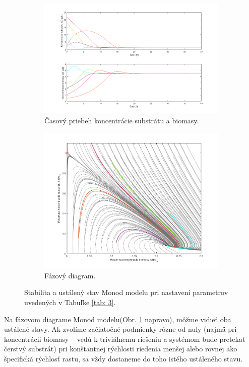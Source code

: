 \begin{figure}
	\begin{subfigure}{.5\textwidth}
		\centering
		\includegraphics[width=1\linewidth]{images/init_cond_Monod}
		\caption[]{Časový priebeh koncentrácie substrátu a biomasy.}
	\end{subfigure}
	\begin{subfigure}{.5\textwidth}
		\centering
		\includegraphics[width=1\linewidth]{images/phase_Monod}
		\caption[]{Fázový diagram.}
	\end{subfigure}
	\caption{Stabilita a ustálený stav Monod modelu pri nastavení parametrov uvedených v Tabuľke \ref{tab: 3}.}
	\label{fig:4}
\end{figure}

Na  fázovom diagrame Monod modelu(Obr. \ref{fig:4} napravo), môžme 
vidieť oba ustálené stavy. Ak zvolíme začiatočné podmienky rôzne od nuly (najmä pri koncentrácii biomasy -- vedú k triviálnemu riešeniu a systémom bude pretekať čerstvý substrát) pri konštantnej rýchlosti riedenia menšej alebo rovnej ako špecifická rýchlosť rastu, sa vždy dostaneme do toho istého ustáleného stavu.

